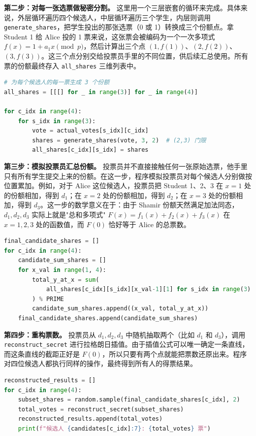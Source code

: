 \documentclass[a4paper]{article}
\begin{document}
\textbf{第二步：对每一张选票做秘密分割。} 这里用一个三层嵌套的循环来完成。具体来说，外层循环遍历四个候选人，中层循环遍历三个学生，内层则调用 \texttt{generate\_shares}，把学生投出的那张选票（0 或 1）转换成三个份额点。拿 Student 1 给 Alice 投的 1 票来说，这张票会被编码为一个一次多项式 $f(x)=1+a_1x \pmod p$，然后计算出三个点 $(1,f(1))$、$(2,f(2))$、$(3,f(3))$。这三个点分别交给投票员手里的不同位置，供后续汇总使用。所有票的份额最终存入 \texttt{all\_shares} 三维列表中。

\begin{lstlisting}[language=Python,caption={秘密分割核心代码片段}]
# 为每个候选人的每一票生成 3 个份额
all_shares = [[[] for _ in range(3)] for _ in range(4)]

for c_idx in range(4):
    for s_idx in range(3):
        vote = actual_votes[s_idx][c_idx]
        shares = generate_shares(vote, 3, 2)  # (2,3) 门限
        all_shares[c_idx][s_idx] = shares
\end{lstlisting}

\textbf{第三步：模拟投票员汇总份额。} 投票员并不直接接触任何一张原始选票，他手里只有所有学生提交上来的份额。在这一步，程序模拟投票员对每个候选人分别做按位置累加。例如，对于 Alice 这位候选人，投票员把 Student 1、2、3 在 $x=1$ 处的份额相加，得到 $d_1$；在 $x=2$ 处的份额相加，得到 $d_2$；在 $x=3$ 处的份额相加，得到 $d_3$。这一步的数学意义在于：由于 Shamir 份额天然满足加法同态，$d_1,d_2,d_3$ 实际上就是"总和多项式" $F(x)=f_1(x)+f_2(x)+f_3(x)$ 在 $x=1,2,3$ 处的函数值，而 $F(0)$ 恰好等于 Alice 的总票数。

\begin{lstlisting}[language=Python,caption={份额汇总核心代码片段}]
final_candidate_shares = []
for c_idx in range(4):
    candidate_sum_shares = []
    for x_val in range(1, 4):
        total_y_at_x = sum(
            all_shares[c_idx][s_idx][x_val-1][1] for s_idx in range(3)
        ) % PRIME
        candidate_sum_shares.append((x_val, total_y_at_x))
    final_candidate_shares.append(candidate_sum_shares)
\end{lstlisting}

\textbf{第四步：重构票数。} 投票员从 $d_1,d_2,d_3$ 中随机抽取两个（比如 $d_1$ 和 $d_3$），调用 \texttt{reconstruct\_secret} 进行拉格朗日插值。由于插值公式可以唯一确定一条直线，而这条直线的截距正好是 $F(0)$，所以只要有两个点就能把票数还原出来。程序对四位候选人都执行同样的操作，最终得到所有人的得票结果。

\begin{lstlisting}[language=Python,caption={票数重构核心代码片段}]
reconstructed_results = []
for c_idx in range(4):
    subset_shares = random.sample(final_candidate_shares[c_idx], 2)
    total_votes = reconstruct_secret(subset_shares)
    reconstructed_results.append(total_votes)
    print(f"候选人 {candidates[c_idx]:7}: {total_votes} 票")
\end{lstlisting}
\end{document}

